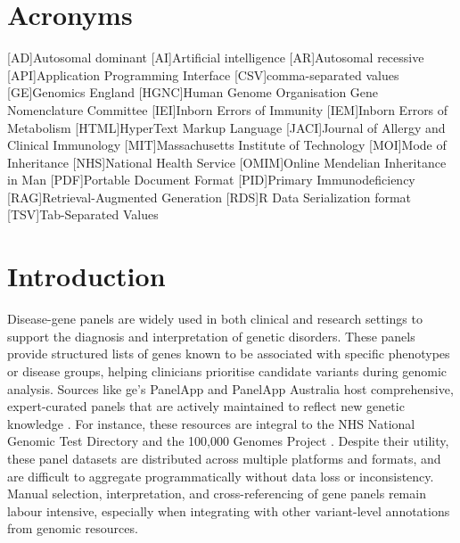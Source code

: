 \section*{Acronyms}
\renewenvironment{description} %
{\list{}{\labelwidth0pt\itemindent-\leftmargin
    \parsep-1em\itemsep0pt\let\makelabel\descriptionlabel}}
               {\endlist}
\begin{acronym} 
[AD]{Autosomal dominant}
\DIFaddbegin {}[AI]{Artificial intelligence}
\DIFaddend {}[AR]{Autosomal recessive}
[API]{Application Programming Interface}
[CSV]{comma-separated values}
[GE]{Genomics England}
[HGNC]{Human Genome Organisation Gene Nomenclature Committee}
[IEI]{Inborn Errors of Immunity}
[IEM]{Inborn Errors of Metabolism}
[HTML]{HyperText Markup Language}
[JACI]{Journal of Allergy and Clinical Immunology}
[MIT]{Massachusetts Institute of Technology}
[MOI]{Mode of Inheritance}
[NHS]{National Health Service}
[OMIM]{Online Mendelian Inheritance in Man}
[PDF]{Portable Document Format}
[PID]{Primary Immunodeficiency}
[RAG]{Retrieval-Augmented Generation}
[RDS]{R Data Serialization format}
[TSV]{Tab-Separated Values}
\end{acronym} 


\section{Introduction}
\noindent
Disease-gene panels are widely used in both clinical and research settings to support the diagnosis and interpretation of genetic disorders. 
These panels provide structured lists of genes known to be associated with specific phenotypes or disease groups, helping clinicians prioritise candidate variants during genomic analysis. 
Sources like \ac{ge}’s PanelApp and PanelApp Australia host comprehensive, expert-curated panels that are actively maintained to reflect new genetic knowledge \cite{martin_panelapp_2019}. 
For instance, these resources are integral to the NHS National Genomic Test Directory and the 100,000 Genomes Project \cite{martin_panelapp_2019}. 
Despite their utility, these panel datasets are distributed across multiple platforms and formats, and are difficult to aggregate programmatically without data loss or inconsistency. 
Manual selection, interpretation, and cross-referencing of gene panels remain labour intensive, especially when integrating with other variant-level annotations from genomic resources. 

